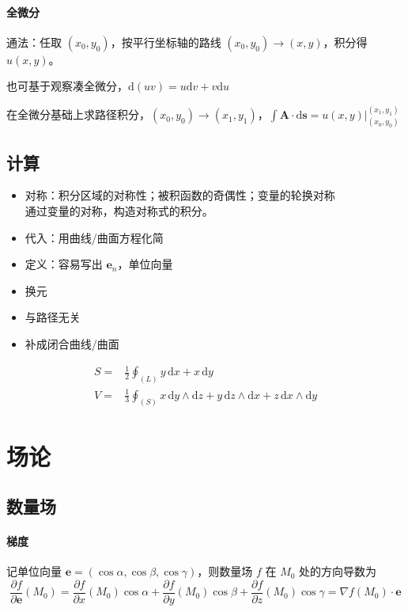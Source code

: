 \documentclass[12pt, a4paper, UTF8, openany]{ctexbook}
\newcommand{\dif}{\mathrm{d}}
\newcommand{\sdif}{\,\dif}
\newcommand{\mat}[1]{\mathbf{#1}}
\begin{document}
        \subsubsection{全微分}
        通法：任取 $(x_0, y_0)$，按平行坐标轴的路线 $(x_0, y_0) \to (x, y)$，积分得 $u(x, y)$。

        也可基于观察凑全微分，$\dif(uv) = u\dif v + v\dif u$

        在全微分基础上求路径积分，$(x_0, y_0) \to (x_1, y_1)$，$\int \mat{A}\cdot\mat{\dif s} = u(x, y)|_{(x_0, y_0)}^{(x_1, y_1)}$

    \section{计算}
    \begin{itemize}
        \item 对称：积分区域的对称性；被积函数的奇偶性；变量的轮换对称 \\
            通过变量的对称，构造对称式的积分。
        \item 代入：用曲线/曲面方程化简
        \item 定义：容易写出 $\mat{e}_n$，{\heiti 单位}向量
        \item 换元
        \item 与路径无关
        \item 补成闭合曲线/曲面
    \end{itemize}

    $$\begin{aligned}
        S =& \frac{1}{2} \oint_{(L)} y\sdif x + x \sdif y \\
        V =& \frac{1}{3} \oint_{(S)} x\sdif y \land \dif z + y\sdif z \land \dif x + z\sdif x \land \dif y
    \end{aligned}$$

    \chapter{场论}
    \section{数量场}
        \subsubsection{梯度}
        记单位向量 $\mat{e} = (\cos\alpha, \cos\beta, \cos\gamma)$，则数量场 $f$ 在 $M_0$ 处的方向导数为
        $$\frac{\partial f}{\partial \mat{e}}(M_0) = \frac{\partial f}{\partial x}(M_0)\cos\alpha + \frac{\partial f}{\partial y}(M_0)\cos\beta + \frac{\partial f}{\partial z}(M_0)\cos\gamma = \nabla f(M_0) \cdot \mat{e}$$
\end{document}
